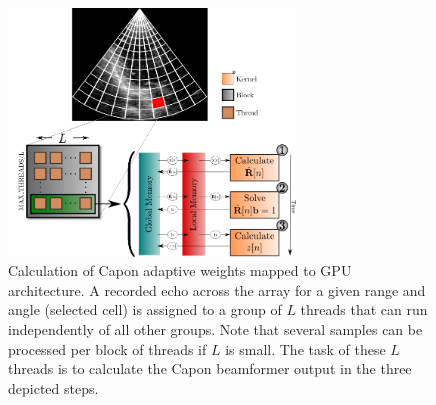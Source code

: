 \documentclass[journal]{IEEEtran}
\begin{document}
\begin{figure}
\centerline{\includegraphics[width=3in]{gfx/gpu_layout_vertical_lr.png}}
\caption{Calculation of Capon adaptive weights mapped to GPU architecture. A recorded echo across the array for a given range and angle (selected cell) is assigned to a group of $L$ threads that can run independently of all other groups. Note that several samples can be processed per block of threads if $L$ is small. The task of these $L$ threads is to calculate the Capon beamformer output in the three depicted steps.}
\label{fig:gpulayout}
\end{figure}



\end{document}

